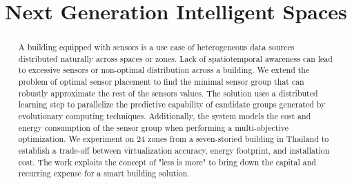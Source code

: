 \documentclass[conference]{IEEEtrans}
\begin{document}
\title{Next Generation Intelligent Spaces\\
}


\maketitle


\begin{abstract}
A building equipped with sensors is a use case of heterogeneous data sources distributed naturally across spaces or zones. Lack of spatiotemporal awareness can lead to excessive sensors or non-optimal distribution across a building. We extend the problem of optimal sensor placement to find the minimal sensor group that can robustly approximate the rest of the sensors values. The solution uses a distributed learning step to parallelize the predictive capability of candidate groups generated by evolutionary computing techniques. Additionally, the system models the cost and energy consumption of the sensor group when performing a multi-objective optimization. We experiment on 24 zones from a seven-storied building in Thailand to establish a trade-off between virtualization accuracy, energy footprint, and installation cost. The work exploits the concept of "less is more" to bring down the capital and recurring expense for a smart building solution.



 
\end{abstract}
\end{document}
